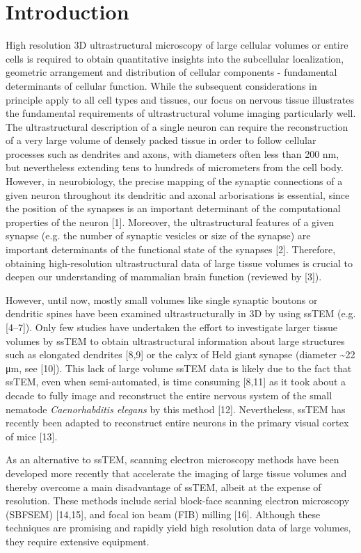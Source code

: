 \documentclass{article}
\begin{document}
\section*{Introduction}

High resolution 3D ultrastructural microscopy of large cellular volumes or entire cells is required to obtain quantitative insights into the subcellular localization, geometric arrangement and distribution of cellular components - fundamental determinants of cellular function. While the subsequent considerations in principle apply to all cell types and tissues, our focus on nervous tissue illustrates the fundamental requirements of ultrastructural volume imaging particularly well. The ultrastructural description of a single neuron can require the reconstruction of a very large volume of densely packed tissue in order to follow cellular processes such as dendrites and axons, with diameters often less than 200 nm, but nevertheless extending tens to hundreds of micrometers from the cell body. However, in neurobiology, the precise mapping of the synaptic connections of a given neuron throughout its dendritic and axonal arborisations is essential, since the position of the synapses is an important determinant of the computational properties of the neuron [1]. Moreover, the ultrastructural features of a given synapse (e.g. the number of synaptic vesicles or size of the synapse) are important determinants of the functional state of the synapses [2]. Therefore, obtaining high-resolution ultrastructural data of large tissue volumes is crucial to deepen our understanding of mammalian brain function (reviewed by [3]).

However, until now, mostly small volumes like single synaptic boutons or dendritic spines have been examined ultrastructurally in 3D by using ssTEM (e.g. [4–7]). Only few studies have undertaken the effort to investigate larger tissue volumes by ssTEM to obtain ultrastructural information about large structures such as elongated dendrites [8,9] or the calyx of Held giant synapse (diameter \textasciitilde{}22 μm, see [10]). This lack of large volume ssTEM data is likely due to the fact that ssTEM, even when semi-automated, is time consuming [8,11] as it took about a decade to fully image and reconstruct the entire nervous system of the small nematode \emph{Caenorhabditis elegans} by this method [12]. Nevertheless, ssTEM has recently been adapted to reconstruct entire neurons in the primary visual cortex of mice [13].

As an alternative to ssTEM, scanning electron microscopy methods have been developed more recently that accelerate the imaging of large tissue volumes and thereby overcome a main disadvantage of ssTEM, albeit at the expense of resolution. These methods include serial block-face scanning electron microscopy (SBFSEM) [14,15], and focal ion beam (FIB) milling [16]. Although these techniques are promising and rapidly yield high resolution data of large volumes, they require extensive equipment.
\end{document}
